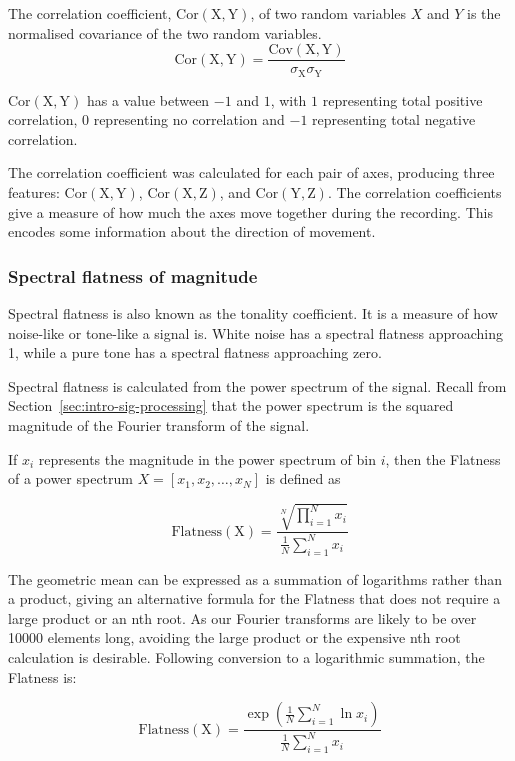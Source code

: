         The correlation coefficient, $\mathrm{Cor(X,Y)}$, of two random variables $X$ and $Y$ is the normalised covariance of the two random variables. $$\mathrm{Cor(X,Y)} = \frac{\mathrm{Cov(X,Y)}}{\sigma_{\mathrm{X}}\sigma_{\mathrm{Y}}}$$
        
        $\mathrm{Cor(X,Y)}$ has a value between $-1$ and $1$, with $1$ representing total positive correlation, $0$ representing no correlation and $-1$ representing total negative correlation.
         
        The correlation coefficient was calculated for each pair of axes, producing three features: $\mathrm{Cor(X,Y)}$, $\mathrm{Cor(X,Z)}$, and $\mathrm{Cor(Y,Z)}$. The correlation coefficients give a measure of how much the axes move together during the recording. This encodes some information about the direction of movement.
      \subsubsection{Spectral flatness of magnitude}
        Spectral flatness is also known as the tonality coefficient. It is a measure of how noise-like or tone-like a signal is. White noise has a spectral flatness approaching 1, while a pure tone has a spectral flatness approaching zero.
        
        Spectral flatness is calculated from the power spectrum of the signal. Recall from Section~\ref{sec:intro-sig-processing} that the power spectrum is the squared magnitude of the Fourier transform of the signal.
        
        If $x_i$ represents the magnitude in the power spectrum of bin $i$, then the Flatness of a power spectrum $X = [x_1, x_2, \dots , x_N]$ is defined as
        
        $$\mathrm{Flatness(X)} = \frac{\sqrt[N]{\prod\limits_{i=1}^N x_i}}{\frac{1}{N}\sum_{i=1}^N x_i}$$
        
        The geometric mean can be expressed as a summation of logarithms rather than a product, giving an alternative formula for the Flatness that does not require a large product or an nth root. As our Fourier transforms are likely to be over 10000 elements long, avoiding the large product or the expensive nth root calculation is desirable. Following conversion to a logarithmic summation, the Flatness is:
        
        $$\mathrm{Flatness(X)} = \frac{\exp \left( \frac{1}{N}\sum\limits_{i=1}^N \ln x_i \right) }{\frac{1}{N}\sum_{i=1}^N x_i}$$
        
